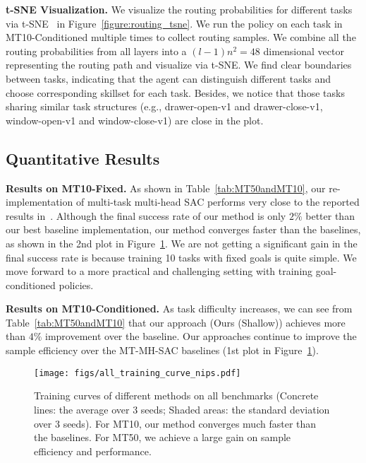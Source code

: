 \documentclass{article}
\begin{document}
\textbf{t-SNE Visualization.} We visualize the routing probabilities for different tasks via t-SNE~\cite{Maaten08visualizingdata} in Figure~\ref{figure:routing_tsne}. We run the policy on each task in MT10-Conditioned multiple times to collect routing samples. We combine all the routing probabilities from all layers into a $(l-1)n^2=48$ dimensional vector representing the routing path and visualize via t-SNE. We find clear boundaries between tasks, indicating that the agent can distinguish different tasks and choose corresponding skillset for each task. Besides, we notice that those tasks sharing similar task structures (e.g., drawer-open-v1 and drawer-close-v1, window-open-v1 and window-close-v1) are close in the plot. 

\vspace{-0.1in}
\subsection{Quantitative Results}
\vspace{-0.1in}


\textbf{Results on MT10-Fixed.} As shown in Table~\ref{tab:MT50andMT10}, our re-implementation of multi-task multi-head SAC performs very close to the reported results in~\cite{yu2019meta}. Although the final success rate of our method is only $2\%$ better than our best baseline implementation, our method converges faster than the baselines, as shown in the 2nd plot in Figure~\ref{figure:general_comparison}. We are not getting a significant gain in the final success rate is because training 10 tasks with fixed goals is quite simple. We move forward to a more practical and challenging setting with training  goal-conditioned policies. 

\textbf{Results on MT10-Conditioned.} As task difficulty increases, we can see from Table~\ref{tab:MT50andMT10} that our approach (Ours (Shallow)) achieves more than $4\%$ improvement over the baseline. Our approaches continue to improve the sample efficiency over the MT-MH-SAC baselines (1st plot in Figure~\ref{figure:general_comparison}). 

\begin{figure}[t]
\begin{center}
    \centering
        \texttt{[image: figs/all\_training\_curve\_nips.pdf]}
        \vspace{-0.25in}
        \caption{Training curves of different methods on all benchmarks (Concrete lines: the average over 3 seeds; Shaded areas: the standard deviation over 3 seeds). For MT10, our method converges much faster than the baselines. For MT50, we achieve a large gain on sample efficiency and performance.}
    \label{figure:general_comparison}
\end{center}
\vspace{-0.1in}
\end{figure}
\end{document}
